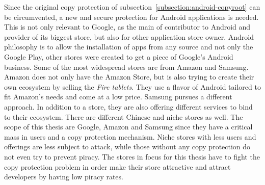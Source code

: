 Since the original copy protection of subsection~\ref{subsection:android-copyroot} can be circumvented, a new and secure protection for Android applications is needed.
This is not only relevant to Google, as the main of contributor to Android and provider of its biggest store, but also for other application store owner.
Android philosophy is to allow the installation of apps from any source and not only the Google Play, other stores were created to get a piece of Google's Android business.
Some of the most widespread stores are from Amazon and Samsung.
\newline
Amazon does not only have the Amazon Store, but is also trying to create their own ecosystem by selling the \textit{Fire tablets}.
They use a flavor of Android tailored to fit Amazon's needs and come at a low price.
\newline
Samsung pursues a different approach.
In addition to a store, they are also offering different services to bind to their ecosystem.
There are different Chinese and niche stores as well.
\newline
The scope of this thesis are Google, Amazon and Samsung since they have a critical mass in users and a copy protection mechanism.
Niche stores with less users and offerings are less subject to attack, while those without any copy protection do not even try to prevent piracy.
\newline
The stores in focus for this thesis have to fight the copy protection problem in order make their store attractive and attract developers by having low piracy rates.
